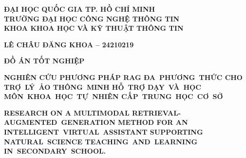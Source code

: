 \begin{titlepage}

    \begin{center}
        {\fontsize{15pt}{16pt}\selectfont \textbf{ĐẠI HỌC QUỐC GIA TP. HỒ CHÍ MINH \\ TRƯỜNG ĐẠI HỌC CÔNG NGHỆ THÔNG TIN \\ KHOA KHOA HỌC VÀ KỸ THUẬT THÔNG TIN}\par}
    \end{center}

    \vfill
    \begin{center}
        {\fontsize{14pt}{18pt}\selectfont \textbf{LÊ CHÂU ĐĂNG KHOA -- 24210219}\par}
    \end{center}

    \vfill
    \begin{center}
        {\fontsize{15pt}{20pt}\selectfont \textbf{ĐỒ ÁN TỐT NGHIỆP}\par}
        
        \vspace{5pt}
        \begin{minipage}{0.9\linewidth}
            \centering
            {\fontsize{16pt}{22pt}\selectfont \textbf{NGHIÊN CỨU PHƯƠNG PHÁP RAG ĐA~PHƯƠNG~THỨC CHO TRỢ~LÝ~ẢO THÔNG~MINH HỖ~TRỢ DẠY~VÀ~HỌC MÔN~KHOA~HỌC~TỰ~NHIÊN CẤP~TRUNG~HỌC~CƠ~SỞ}\par}
            
            \vspace{8pt}
            {\fontsize{13pt}{18pt}\selectfont \textbf{RESEARCH ON A MULTIMODAL RETRIEVAL-AUGMENTED~GENERATION METHOD FOR AN INTELLIGENT~VIRTUAL~ASSISTANT SUPPORTING NATURAL~SCIENCE TEACHING~AND~LEARNING IN~SECONDARY~SCHOOL.}\par}
        \end{minipage}
    \end{center}


\end{titlepage}
